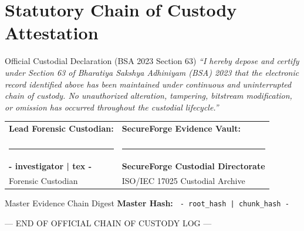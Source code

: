 \documentclass[12pt]{article}
\begin{document}
\section{Statutory Chain of Custody Attestation}

\begin{statutorybox}{Official Custodial Declaration (BSA 2023 Section 63)}
\textit{``I hereby depose and certify under Section 63 of Bharatiya Sakshya Adhiniyam (BSA) 2023 that the electronic record identified above has been maintained under continuous and uninterrupted chain of custody. No unauthorized alteration, tampering, bitstream modification, or omission has occurred throughout the custodial lifecycle.''}
\end{statutorybox}

\vspace{0.8cm}

\begin{table}[H]
\centering
\noindent
\begin{tabularx}{\textwidth}{XX}
\textbf{Lead Forensic Custodian:} & \textbf{SecureForge Evidence Vault:} \tabularnewline
\vspace{0.1cm} & \vspace{0.1cm} \tabularnewline
\rule{7.0cm}{0.8pt} & \rule{7.0cm}{0.8pt} \tabularnewline
\textbf{ {{- investigator | tex -}} } & \textbf{SecureForge Custodial Directorate} \tabularnewline
Forensic Custodian & ISO/IEC 17025 Custodial Archive \tabularnewline
\end{tabularx}
\end{table}

\vspace{0.2cm}
\begin{infocard}{Master Evidence Chain Digest}
\noindent
\textbf{Master Hash:} {\small\texttt{ {{- root_hash | chunk_hash -}} }}
\end{infocard}

\vfill
\begin{center}
\small\textcolor{neutralgray}{--- END OF OFFICIAL CHAIN OF CUSTODY LOG ---}
\end{center}
\end{document}
